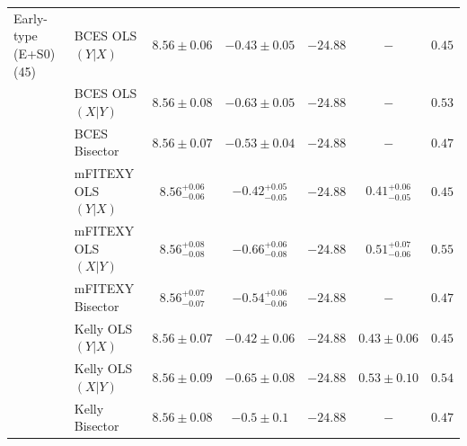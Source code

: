 \documentclass[preprint2]{emulateapj}
\begin{document}
\begin{table}
\begin{tabular}{llccccc}
 Early-type (E+S0) (45) & BCES OLS$(Y|X)$   & $8.56 \pm 0.06$ & $-0.43 \pm 0.05$ & $-24.88$ & $-$ & $0.45$ \\
 			& BCES OLS$(X|Y)$   & $8.56 \pm 0.08$ & $-0.63 \pm 0.05$ & $-24.88$ & $-$ & $0.53$ \\
 			& BCES Bisector     & $8.56 \pm 0.07$ & $-0.53 \pm 0.04$ & $-24.88$ & $-$ & $0.47$ \\
 			& mFITEXY OLS$(Y|X)$ & $8.56^{+0.06}_{-0.06}$ & $-0.42^{+0.05}_{-0.05}$ & $-24.88$ & $0.41^{+0.06}_{-0.05}$ & $0.45$ \\
 			& mFITEXY OLS$(X|Y)$ & $8.56^{+0.08}_{-0.08}$ & $-0.66^{+0.06}_{-0.08}$ & $-24.88$ & $0.51^{+0.07}_{-0.06}$ & $0.55$ \\
 			& mFITEXY Bisector   & $8.56^{+0.07}_{-0.07}$ & $-0.54^{+0.06}_{-0.06}$ & $-24.88$ & $-$    & $0.47$ \\
 			& Kelly OLS$(Y|X)$  & $8.56 \pm 0.07$ & $-0.42 \pm 0.06$ & $-24.88$ & $0.43 \pm 0.06$ & $0.45$ \\
 			& Kelly OLS$(X|Y)$  & $8.56 \pm 0.09$ & $-0.65 \pm 0.08$ & $-24.88$ & $0.53 \pm 0.10$ & $0.54$ \\
 			& Kelly Bisector    & $8.56 \pm 0.08$ & $-0.5 \pm 0.1$ & $-24.88$ & $-$    & $0.47$ \\



\end{tabular}
\end{table}
\end{document}
